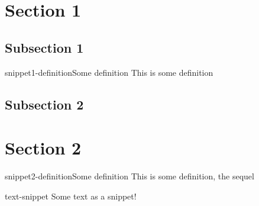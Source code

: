 \documentclass[preview]{standalone}
\begin{document}
\genpage

\section{Section 1}

\subsection{Subsection 1}

\begin{snippetdefinition}{snippet1-definition}{Some definition}
    This is some definition
\end{snippetdefinition}

\subsection{Subsection 2}

\section{Section 2}

\begin{snippetdefinition}{snippet2-definition}{Some definition}
    This is some definition, the sequel
\end{snippetdefinition}


\begin{snippet}{text-snippet}
    Some text as a snippet!
\end{snippet}
\end{document}
